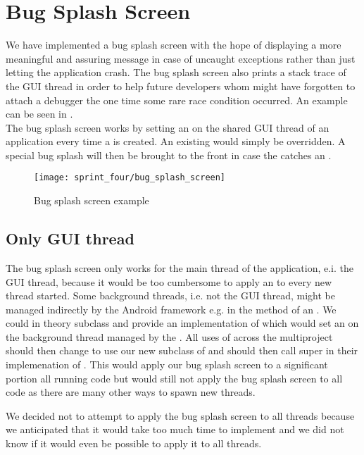 
\section{Bug Splash Screen}
\label{sec:bug_splash_screen}

We have implemented a bug splash screen with the hope of displaying a more meaningful and assuring message in case of uncaught exceptions rather than just letting the application crash. The bug splash screen also prints a stack trace of the GUI thread in order to help future developers whom might have forgotten to attach a debugger the one time some rare race condition occurred. An example can be seen in .\\

The bug splash screen works by setting an  on the shared GUI thread of an application every time a  is created. An existing  would simply be overridden. A special bug splash  will then be brought to the front in case the  catches an .

\begin{figure}[!htbp]
        \centering
        \texttt{[image: sprint\_four/bug\_splash\_screen]}
        \caption{Bug splash screen example}
        \label{fig:bug_splash_screen_example}
\end{figure}

\subsection{Only GUI thread} 
The bug splash screen only works for the main thread of the application, e.i. the GUI thread, because it would be too cumbersome to apply an  to every new thread started. Some background threads, i.e. not the GUI thread, might be managed indirectly by the Android framework e.g. in the  method of an . We could in theory subclass  and provide an implementation of  which would set an  on the background thread managed by the . All uses of  across the \giraf multiproject should then change to use our new subclass of  and should then call super in their implemenation of . This would apply our bug splash screen to a significant portion all running code but would still not apply the bug splash screen to all code as there are many other ways to spawn new threads. 

We decided not to attempt to apply the bug splash screen to all threads because we anticipated that it would take too much time to implement and we did not know if it would even be possible to apply it to all threads.          
